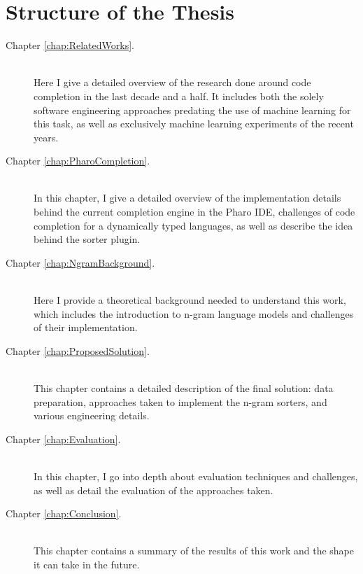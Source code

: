\section{Structure of the Thesis}
\label{sec:Introduction-Structure}
{\hypersetup{linkcolor=black}
\begin{description}
	\item [Chapter \ref{chap:RelatedWorks}. ] \hfill \\
	Here I give a detailed overview of the research done around code completion in the last decade and a half. It includes both the solely software engineering approaches predating the use of machine learning for this task, as well as exclusively machine learning experiments of the recent years.
    \item [Chapter \ref{chap:PharoCompletion}. ] \hfill \\
	In this chapter, I give a detailed overview of the implementation details behind the current completion engine in the Pharo IDE, challenges of code completion for a dynamically typed languages, as well as describe the idea behind the sorter plugin.
	\item [Chapter \ref{chap:NgramBackground}. ] \hfill \\
    Here I provide a theoretical background needed to understand this work, which includes the introduction to n-gram language models and challenges of their implementation.
    \item [Chapter \ref{chap:ProposedSolution}. ] \hfill \\
	This chapter contains a detailed description of the final solution: data preparation, approaches taken to implement the n-gram sorters, and various engineering details.
	\item [Chapter \ref{chap:Evaluation}. ] \hfill \\
    In this chapter, I go into depth about evaluation techniques and challenges, as well as detail the evaluation of the approaches taken.
    \item [Chapter \ref{chap:Conclusion}. ] \hfill \\
	This chapter contains a summary of the results of this work and the shape it can take in the future.
\end{description}
}